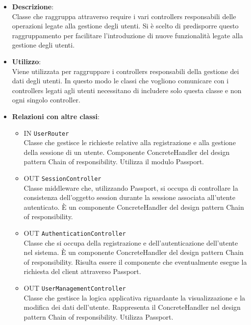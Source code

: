 \begin{itemize}
	\item 
	\textbf{Descrizione}:\\
	Classe che raggruppa attraverso require i vari controllers responsabili delle operazioni legate alla gestione degli utenti. Si è scelto di predisporre questo raggruppamento per facilitare l'introduzione di nuove funzionalità legate alla gestione degli utenti.
	\item \textbf{Utilizzo}:\\
	Viene utilizzata per raggruppare i controllers responsabili della gestione dei dati degli utenti. In questo modo le classi che vogliono comunicare con i controllers legati agli utenti necessitano di includere solo questa classe e non ogni singolo controller.
	\item \textbf{Relazioni con altre classi}:\\
	\begin{itemize}
		\item 
			IN	\texttt{UserRouter}\\
			Classe che gestisce le richieste relative alla registrazione e alla gestione della sessione di un utente. Componente ConcreteHandler del design pattern Chain of responsibility. Utilizza il modulo Passport.		
		\item 
			OUT \texttt{SessionController}\\
			Classe middleware che, utilizzando Passport, si occupa di controllare la consistenza dell'oggetto session durante la sessione associata all'utente autenticato. È un componente ConcreteHandler del design pattern Chain of responsibility.
		\item 
			OUT \texttt{AuthenticationController}\\
			Classe che si occupa della registrazione e dell'autenticazione dell'utente nel sistema. È un componente ConcreteHandler del design pattern Chain of responsibility. Risulta essere il componente che eventualmente esegue la richiesta del client attraverso Passport.	
		\item 
			OUT \texttt{UserManagementController}\\
			Classe che gestisce la logica applicativa riguardante la visualizzazione e la modifica dei dati dell'utente.
			Rappresenta il ConcreteHandler nel design pattern Chain of responsibility. Utilizza Passport.
	\end{itemize}
\end{itemize}
